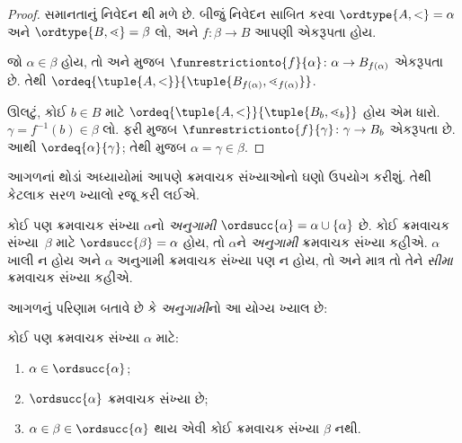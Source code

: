 \begin{proof}
સમાનતાનું નિવેદન થી મળે છે. બીજું
નિવેદન સાબિત કરવા $\ordtype{A, <} = \alpha$ અને $\ordtype{B,
\lessdot} = \beta$ લો, અને $f \colon \beta \to B$
આપણી એકરૂપતા હોય.

જો $\alpha \in \beta$ હોય, તો
 અને
 મુજબ
$\funrestrictionto{f}{\alpha} \colon \alpha \to B_{f(\alpha)}$
એકરૂપતા છે. તેથી
$\ordeq{\tuple{A, <}}{\tuple{B_{f(\alpha)}, \lessdot_{f(\alpha)}}}$.

ઊલટું, કોઈ $b \in B$ માટે
$\ordeq{\tuple{A, <}}{\tuple{B_b, \lessdot_b}}$ હોય એમ ધારો.
$\gamma=f^{-1}(b)\in\beta$ લો. ફરી
 મુજબ
$\funrestrictionto{f}{\gamma} \colon \gamma \to B_b$ એકરૂપતા છે.
આથી $\ordeq{\alpha}{\gamma}$; તેથી
 મુજબ $\alpha=\gamma\in\beta$.
\end{proof}
\endgroup

\begingroup
\makeatletter{}\makeatother

\label{guunit:OLP-0557}


આગળનાં થોડાં અધ્યાયોમાં આપણે ક્રમવાચક સંખ્યાઓનો ઘણો ઉપયોગ
કરીશું. તેથી કેટલાક સરળ ખ્યાલો રજૂ કરી લઈએ.

\begin{defn}
કોઈ પણ ક્રમવાચક સંખ્યા $\alpha$નો \emph{અનુગામી}
$\ordsucc{\alpha}
=\alpha \cup \{\alpha\}$ છે. કોઈ ક્રમવાચક સંખ્યા~$\beta$ માટે
$\ordsucc{\beta} = \alpha$ હોય, તો $\alpha$ને
\emph{અનુગામી} ક્રમવાચક સંખ્યા કહીએ. $\alpha$ ખાલી ન હોય અને
$\alpha$ અનુગામી ક્રમવાચક સંખ્યા પણ ન હોય, તો અને માત્ર તો તેને
\emph{સીમા} ક્રમવાચક સંખ્યા કહીએ.
\end{defn}
\noindent
આગળનું પરિણામ બતાવે છે કે \emph{અનુગામી}નો આ યોગ્ય ખ્યાલ છે:

\begin{prop}
કોઈ પણ ક્રમવાચક સંખ્યા $\alpha$ માટે:
\begin{enumerate}
	\item $\alpha \in \ordsucc{\alpha}$;
	\item $\ordsucc{\alpha}$ ક્રમવાચક સંખ્યા છે;
	\item $\alpha \in \beta \in
	\ordsucc{\alpha}$ થાય એવી કોઈ ક્રમવાચક સંખ્યા $\beta$ નથી.
	\end{enumerate}
\end{prop}

